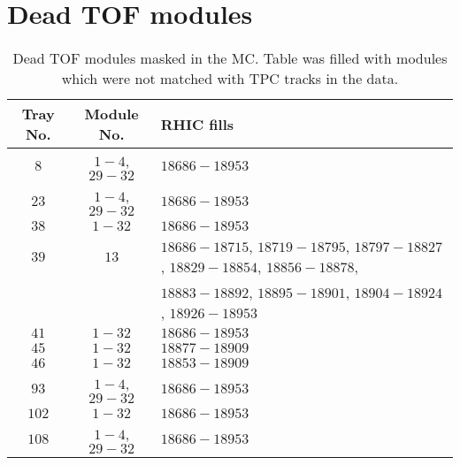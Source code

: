 
\chapter{Dead TOF modules}\label{appendix:tofDeadTraysModules}
\begin{table}[h]%
	\centering%
	\begin{tabular}{c|c|l}%
		\textbf{Tray No.}&	\textbf{Module No.} & 	\textbf{RHIC fills}\\ \hline
		$8$	& $1-4$, $29-32$ & $18686-18953$\\ \hline
		$23$	& $1-4$, $29-32$ & $18686-18953$\\ \hline
		$38$	& $1-32$ & $18686-18953$\\ \hline
		$39$	& $13$ & $18686-18715$, $18719-18795$, $18797-18827$, $18829-18854$, $18856-18878$,\\
		& &$18883-18892$, $18895-18901$, $18904-18924$, $18926-18953$\\ \hline
		$41$	& $1-32$ & $18686-18953$\\ \hline
		$45$	& $1-32$ & $18877-18909$\\ \hline
		$46$	& $1-32$ & $18853-18909$\\ \hline
		$93$	& $1-4$, $29-32$ & $18686-18953$\\ \hline
		$102$	& $1-32$ & $18686-18953$\\ \hline
		$108$	& $1-4$, $29-32$ & $18686-18953$\\ \hline
	\end{tabular}%
	\caption[Dead TOF modules masked in the MC.]{Dead TOF modules masked in the MC. Table was filled with modules which were not matched with TPC tracks in the data.}\label{tab:tofDeadModules}
\end{table}